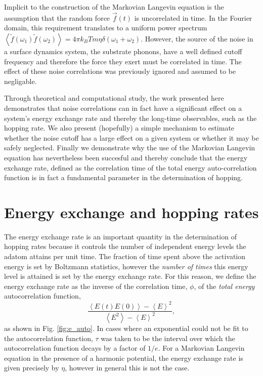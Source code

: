 \documentclass[7pt]{article}
\begin{document}
Implicit to the construction of the Markovian Langevin equation is the assumption that the random force $\vec{f}(t)$ is uncorrelated in time. In the Fourier domain, this requirement translates to a uniform power spectrum $\left<\tilde{f}(\omega_1)\tilde{f}(\omega_2)\right>=4\pi k_BTm\eta\delta(\omega_1+\omega_2)$. However, the source of the noise in a surface dynamics system, the substrate phonons, have a well defined cutoff frequency and therefore the force they exert must be correlated in time. The effect of these noise correlations was previously ignored and assumed to be negligable. 

Through theoretical and computational study, the work presented here demonstrates that noise correlations can in fact have a significant effect on a system's energy exchange rate and thereby the long-time observables, such as the hopping rate. We also present (hopefully) a simple mechanism to estimate whether the noise cutoff has a large effect on a given system or whether it may be safely neglected. Finally we demonstrate why the use of the Markovian Langevin equation has nevertheless been succesful and thereby conclude that the energy exchange rate, defined as the correlation time of the total energy auto-correlation function is in fact a fundamental parameter in the determination of hopping. 

\section*{Energy exchange and hopping rates}

The energy exchange rate is an important quantity in the determination of hopping rates because it controls the number of independent energy levels the adatom attains per unit time. The fraction of time spent above the activation energy is set by Boltzmann statistics, however the \emph{number of times} this energy level is attained is set by the energy exchange rate. For this reason, we define the energy exchange rate as the inverse of the correlation time, $\phi$, of the \emph{total energy} autocorrelation function, $$\frac{\left<E(t)E(0)\right> - \left<E\right>^2}{\left<E^2\right> - \left<E\right>^2},$$ as shown in Fig. \ref{fig:e_auto}. In cases where an exponential could not be fit to the autocorrelation function, $\tau$ was taken to be the interval over which the autocorrelation function decays by a factor of $1/e$. For a Markovian Langevin equation in the presence of a harmonic potential, the energy exchange rate is given precisely by $\eta$, however in general this is not the case.
\end{document}
